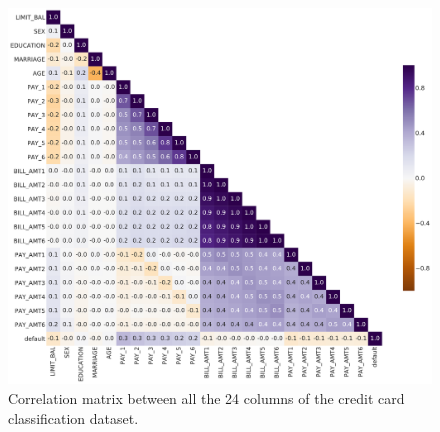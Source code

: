 \documentclass[10pt, twocolumn]{article}
\begin{document}
\begin{appendices}
\begin{figure}[h]
    \centering
    \includegraphics[scale=0.4]{../figs/CC_corr_all.pdf}
    \caption{Correlation matrix between all the 24 columns of the credit card classification dataset.}
    \label{fig:CC_corr_all}
\end{figure}

\end{appendices}
\end{document}
